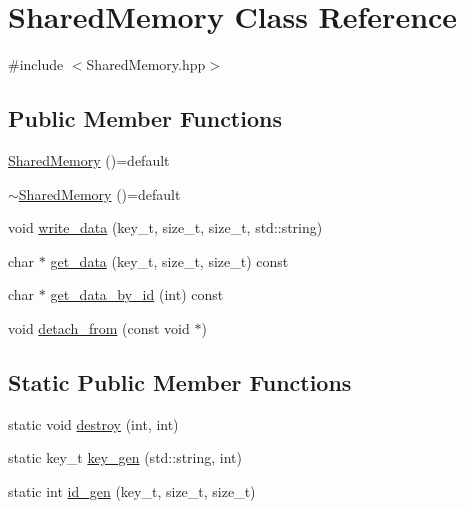 \hypertarget{class_shared_memory}{}\section{Shared\+Memory Class Reference}
\label{class_shared_memory}


{\ttfamily \#include $<$Shared\+Memory.\+hpp$>$}

\subsection*{Public Member Functions}
\begin{DoxyCompactItemize}
\item 
\hyperlink{class_shared_memory_a851a8d425f9c1e6f49237efd97628df5}{Shared\+Memory} ()=default
\item 
\hyperlink{class_shared_memory_a7467ee9b4149f66e660b0af3f0706a51}{$\sim$\+Shared\+Memory} ()=default
\item 
void \hyperlink{class_shared_memory_a49a12f61b3b8bd4811a1351c434dd121}{write\+\_\+data} (key\+\_\+t, size\+\_\+t, size\+\_\+t, std\+::string)
\item 
char $\ast$ \hyperlink{class_shared_memory_a35b6a9038b69b6abd3128cd028670cf6}{get\+\_\+data} (key\+\_\+t, size\+\_\+t, size\+\_\+t) const
\item 
char $\ast$ \hyperlink{class_shared_memory_a209fcce32c646bd4ad4e2492004b32c5}{get\+\_\+data\+\_\+by\+\_\+id} (int) const
\item 
void \hyperlink{class_shared_memory_af5531b0b30d05f359719e406886aa61e}{detach\+\_\+from} (const void $\ast$)
\end{DoxyCompactItemize}
\subsection*{Static Public Member Functions}
\begin{DoxyCompactItemize}
\item 
static void \hyperlink{class_shared_memory_a747779f81bac44bdf42172160199cfe2}{destroy} (int, int)
\item 
static key\+\_\+t \hyperlink{class_shared_memory_a05547eb8707ee646607334893b4196c3}{key\+\_\+gen} (std\+::string, int)
\item 
static int \hyperlink{class_shared_memory_af171de2b17ae37c2e19a0980000d2f60}{id\+\_\+gen} (key\+\_\+t, size\+\_\+t, size\+\_\+t)
\end{DoxyCompactItemize}


